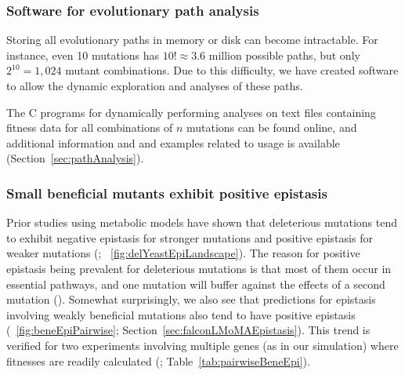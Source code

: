 \subsubsection{Software for evolutionary path analysis}

Storing all evolutionary paths in memory or disk can become 
intractable. For instance, even 10 mutations has $10! \approx
3.6$ million possible paths, but only $2^{10} = 1,024$ mutant
combinations. Due to this difficulty, we have created software to allow 
the dynamic exploration and analyses of these paths. 

The C programs for dynamically performing analyses on text files
containing fitness data for all combinations of $n$ mutations can be
found online, and additional information and and examples related to
usage is available (\suppOrApp Section~\ref{sec:pathAnalysis}).

\subsubsection{Small beneficial mutants exhibit positive epistasis}

Prior studies using metabolic models have shown that deleterious
mutations tend to exhibit negative epistasis for stronger mutations
and positive epistasis for weaker mutations (\citep{He2010, Xu2012};
\suppOrApp \Fig~\ref{fig:delYeastEpiLandscape}). The reason for positive epistasis
being prevalent for deleterious mutations is that most of them occur
in essential pathways, and one mutation will buffer against the
effects of a second mutation (\citep{Xu2012}). Somewhat surprisingly,
we also see that predictions for epistasis involving weakly beneficial
mutations also tend to have positive epistasis
(\Fig~\ref{fig:beneEpiPairwise}; Section~\ref{sec:falconLMoMAEpistasis}). 
This trend is verified for two experiments involving
multiple genes (as in our simulation) where fitnesses are readily
calculated (\citep{Chou2011, Khan2011}; Table~\ref{tab:pairwiseBeneEpi}).

